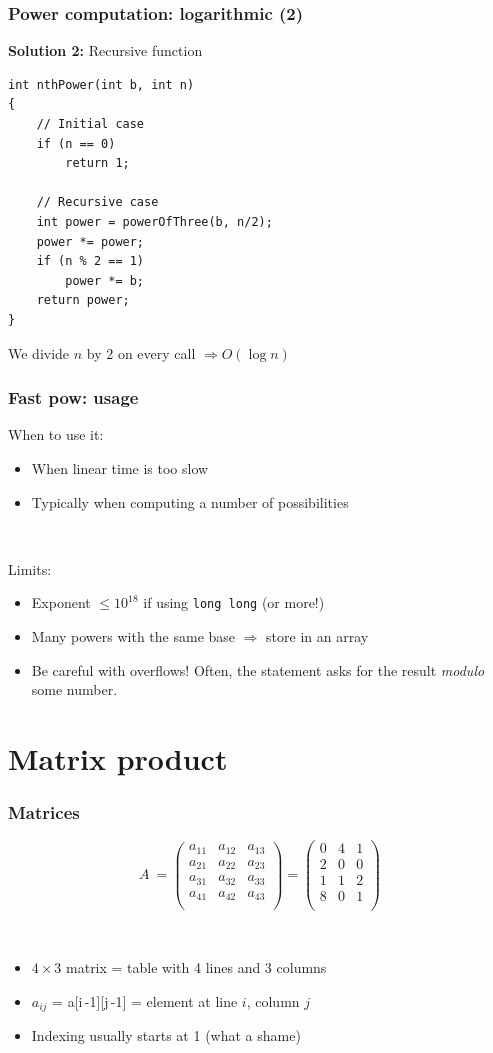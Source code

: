 \documentclass[12pt]{beamer}
\begin{document}
\begin{frame}[fragile]
\frametitle{Power computation: logarithmic (2)}
\textbf{Solution 2:} Recursive function
\begin{lstlisting}[frame=single]
int nthPower(int b, int n)
{
    // Initial case
    if (n == 0)
        return 1;
    
    // Recursive case
    int power = powerOfThree(b, n/2);
    power *= power;
    if (n % 2 == 1)
        power *= b;
    return power;
}
\end{lstlisting}
We divide $n$ by 2 on every call $\Rightarrow O(\log n)$
\end{frame}

\begin{frame}
\frametitle{Fast pow: usage}
When to use it:
\begin{itemize}
\item When linear time is too slow
\item Typically when computing a number of possibilities
\end{itemize}

~

Limits:
\begin{itemize}
\item Exponent $\leq 10^{18}$ if using \texttt{long long} (or more!)
\item Many powers with the same base $\Rightarrow$ store in an array
\item Be careful with overflows! Often, the statement asks for the result \emph{modulo} some number.
\end{itemize}
\end{frame}

\section{Matrix product}

\begin{frame}
\frametitle{Matrices}
\[
A\ =
\left(
\begin{array}{ccc}
a_{11}&a_{12}&a_{13}\\
a_{21}&a_{22}&a_{23}\\
a_{31}&a_{32}&a_{33}\\
a_{41}&a_{42}&a_{43}\\
\end{array}
\right)
=
\left(
\begin{array}{ccc}
0&4&1\\
2&0&0\\
1&1&2\\
8&0&1\\
\end{array}
\right)
\]

~

\begin{itemize}
\item $4 \times 3$ matrix = table with 4 lines and 3 columns
\item $a_{ij}$ = a[i\,-1][j\,-1] = element at line $i$, column $j$
\item Indexing usually starts at 1 (what a shame)
\end{itemize}
\end{frame}
\end{document}
